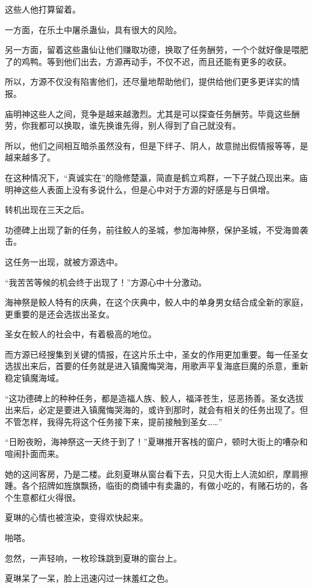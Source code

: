 \begin{this_body}
这些人他打算留着。

一方面，在乐土中屠杀蛊仙，具有很大的风险。

另一方面，留着这些蛊仙让他们赚取功德，换取了任务酬劳，一个个就好像是喂肥了的鸡鸭。等到他们出去，方源再动手，不仅不迟，而且还能有更多的收获。

所以，方源不仅没有陷害他们，还尽量地帮助他们，提供给他们更多更详实的情报。

庙明神这些人之间，竞争是越来越激烈。尤其是可以探查任务酬劳。毕竟这些酬劳，你我都可以换取，谁先换谁先得，别人得到了自己就没有。

所以，他们之间相互暗杀虽然没有，但是下绊子、阴人，故意抛出假情报等等，是越来越多了。

在这种情况下，“真诚实在”的隐修楚瀛，简直是鹤立鸡群，一下子就凸现出来。庙明神这些人表面上没有多说什么，但是心中对于方源的好感是与日俱增。

转机出现在三天之后。

功德碑上出现了新的任务，前往鲛人的圣城，参加海神祭，保护圣城，不受海兽袭击。

这任务一出现，就被方源选中。

“我苦苦等候的机会终于出现了！”方源心中十分激动。

海神祭是鲛人特有的庆典，在这个庆典中，鲛人中的单身男女结合成全新的家庭，更重要的是还会选拔出圣女。

圣女在鲛人的社会中，有着极高的地位。

而方源已经搜集到关键的情报，在这片乐土中，圣女的作用更加重要。每一任圣女选拔出来后，首要的任务就是进入镇魔悔哭海，用歌声平复海底巨魔的杀意，重新稳定镇魔海域。

“这功德碑上的种种任务，都是造福人族、鲛人，福泽苍生，惩恶扬善。圣女选拔出来后，必定是要进入镇魔悔哭海的，或许到那时，就会有相关的任务出现了。但不管怎样，我得先将这个任务接下来，提前接触到圣女……”

“日盼夜盼，海神祭这一天终于到了！”夏琳推开客栈的窗户，顿时大街上的嘈杂和喧闹扑面而来。

她的这间客房，乃是二楼。此刻夏琳从窗台看下去，只见大街上人流如织，摩肩擦踵。各个招牌如旌旗飘扬，临街的商铺中有卖蛊的，有做小吃的，有赌石坊的，各个生意都红火得很。

夏琳的心情也被渲染，变得欢快起来。

啪嗒。

忽然，一声轻响，一枚珍珠跳到夏琳的窗台上。

夏琳呆了一呆，脸上迅速闪过一抹羞红之色。


\end{this_body}
